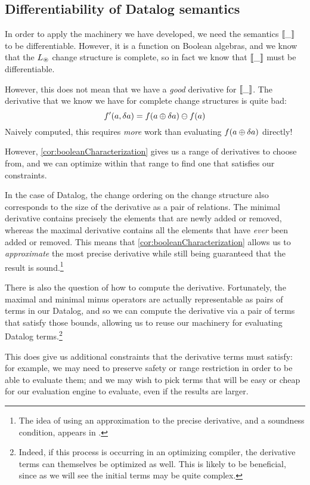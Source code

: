 \subsection{Differentiability of Datalog semantics}
\label{sec:datalogDifferentiability}

In order to apply the machinery we have developed, we need the semantics $\llbracket \_ \rrbracket$ to
be differentiable. However, it is a function on Boolean algebras, and we know
that the $L_\circledast$ change structure is complete, so in fact we know that
$\llbracket \_ \rrbracket$ must be differentiable.

However, this does not mean that we have a \emph{good} derivative for
$\llbracket \_ \rrbracket$. The derivative that we know we have for complete change structures
is quite bad:
$$f'(a, \delta a) = f(a \oplus \delta a) \ominus f(a)$$
Naively computed, this requires \emph{more} work than evaluating $f(a \oplus \delta a)$ directly!

However, \cref{cor:booleanCharacterization} gives us a range of derivatives to
choose from, and we can optimize within that range to find one that satisfies
our constraints.

In the case of Datalog, the change ordering on the change structure also
corresponds to the size of the derivative as a pair of relations. The minimal
derivative contains precisely the elements that are newly added or removed,
whereas the maximal derivative contains all the elements that have \emph{ever}
been added or removed. This means that \cref{cor:booleanCharacterization} allows
us to \emph{approximate} the most precise derivative while still being
guaranteed that the result is sound.\footnote{The idea of using an approximation
to the precise derivative, and a soundness condition, appears in \textcite{bancilhon1986amateur}.}

There is also the question of how to compute the derivative. Fortunately, the
maximal and minimal minus operators are actually representable as pairs of terms
in our Datalog, and so we can compute the derivative via a pair of terms that
satisfy those bounds, allowing us to reuse our machinery for evaluating Datalog
terms.\footnote{Indeed, if this process is occurring in an optimizing compiler,
  the derivative terms can themselves be optimized as well. This is likely to be
  beneficial, since as we will see the initial terms may be quite complex.}

This does give us additional constraints that the derivative terms must satisfy:
for example, we may need to preserve safety or range restriction in order to be
able to evaluate them; and we may wish to pick terms that will be easy or cheap
for our evaluation engine to evaluate, even if the results are larger.

